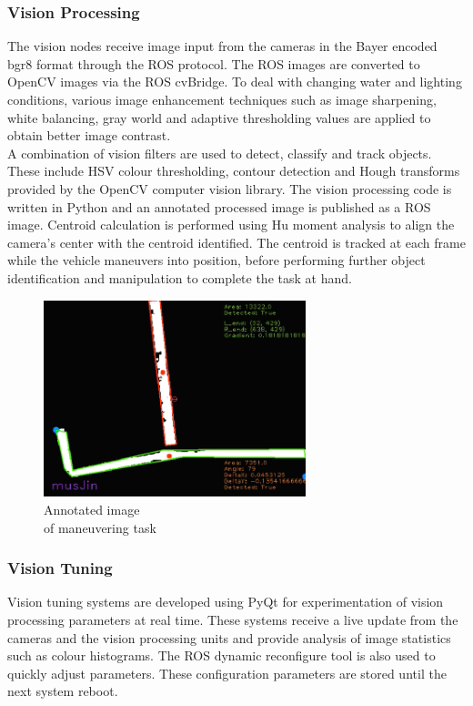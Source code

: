\documentclass[journal,12pt]{IEEEtran}
\begin{document}
\subsubsection{Vision Processing}
The vision nodes receive image input from the cameras in the Bayer encoded bgr8 format through the ROS protocol. The ROS images are converted to OpenCV images via the ROS cvBridge. To deal with changing water and lighting conditions, various image enhancement techniques such as image sharpening, white balancing, gray world and adaptive thresholding values are applied to obtain better image contrast. \\

A combination of vision filters are used to detect, classify and track objects. These include HSV colour thresholding, contour detection and Hough transforms provided by the OpenCV computer vision library. The vision processing code is written in Python and an annotated processed image is published as a ROS image. Centroid calculation is performed using Hu moment analysis to align the camera's center with the centroid identified. The centroid is tracked at each frame while the vehicle maneuvers into position, before performing further object identification and manipulation to complete the task at hand. \\

\begin{figure}[h]
\centering
\includegraphics[width=3.0in]{manu_paper_filter.png}
\caption{Annotated image \\ of maneuvering task}
\captionsetup{justification=centering}
\label{fig:image_manu}
\end{figure}

\subsubsection{Vision Tuning}
Vision tuning systems are developed using PyQt for experimentation of vision processing parameters at real time. These systems receive a live update from the cameras and the vision processing units and provide analysis of image statistics such as colour histograms. The ROS dynamic reconfigure tool is also used to quickly adjust parameters. These configuration parameters are stored until the next system reboot.  
\end{document}
